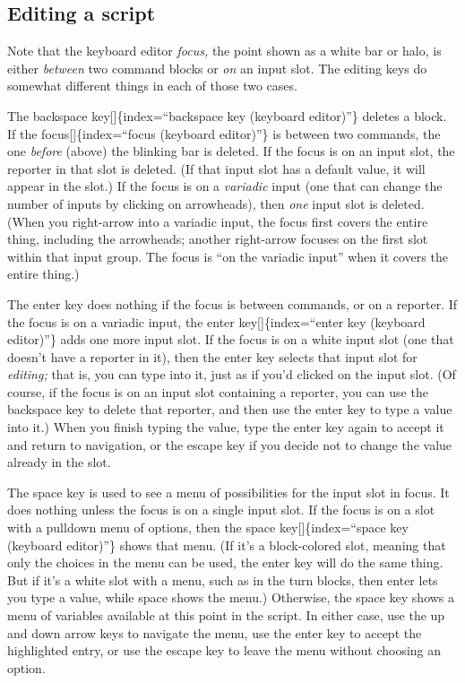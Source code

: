 \documentclass[
  letterpaper,
]{book}
\begin{document}
\subsection{Editing a script}\label{editing-a-script}

Note that the keyboard editor \emph{focus,} the point shown as a white
bar or halo, is either \emph{between} two command blocks or \emph{on} an
input slot. The editing keys do somewhat different things in each of
those two cases.

The backspace key{[}{]}\{index=``backspace key (keyboard editor)''\}
deletes a block. If the focus{[}{]}\{index=``focus (keyboard editor)''\}
is between two commands, the one \emph{before} (above) the blinking bar
is deleted. If the focus is on an input slot, the reporter in that slot
is deleted. (If that input slot has a default value, it will appear in
the slot.) If the focus is on a \emph{variadic} input (one that can
change the number of inputs by clicking on arrowheads), then \emph{one}
input slot is deleted. (When you right-arrow into a variadic input, the
focus first covers the entire thing, including the arrowheads; another
right-arrow focuses on the first slot within that input group. The focus
is ``on the variadic input'' when it covers the entire thing.)

The enter key does nothing if the focus is between commands, or on a
reporter. If the focus is on a variadic input, the enter
key{[}{]}\{index=``enter key (keyboard editor)''\} adds one more input
slot. If the focus is on a white input slot (one that doesn't have a
reporter in it), then the enter key selects that input slot for
\emph{editing;} that is, you can type into it, just as if you'd clicked
on the input slot. (Of course, if the focus is on an input slot
containing a reporter, you can use the backspace key to delete that
reporter, and then use the enter key to type a value into it.) When you
finish typing the value, type the enter key again to accept it and
return to navigation, or the escape key if you decide not to change the
value already in the slot.

The space key is used to see a menu of possibilities for the input slot
in focus. It does nothing unless the focus is on a single input slot. If
the focus is on a slot with a pulldown menu of options, then the space
key{[}{]}\{index=``space key (keyboard editor)''\} shows that menu. (If
it's a block-colored slot, meaning that only the choices in the menu can
be used, the enter key will do the same thing. But if it's a white slot
with a menu, such as in the turn blocks, then enter lets you type a
value, while space shows the menu.) Otherwise, the space key shows a
menu of variables available at this point in the script. In either case,
use the up and down arrow keys to navigate the menu, use the enter key
to accept the highlighted entry, or use the escape key to leave the menu
without choosing an option.
\end{document}
